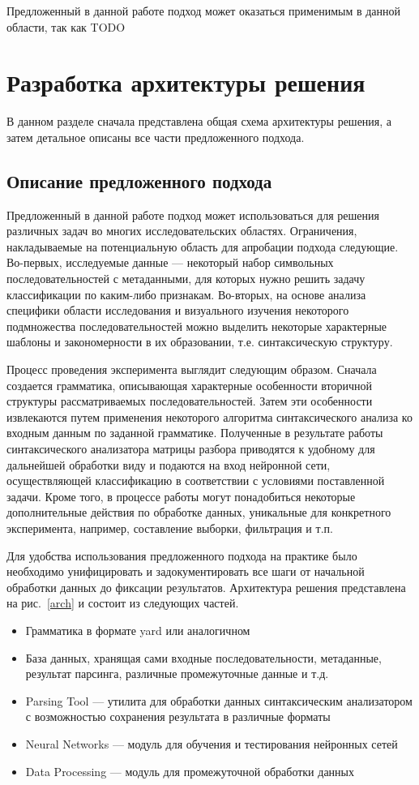 \documentclass[14pt]{matmex-diploma-custom}
\begin{document}
Предложенный в данной работе подход может оказаться применимым в данной области, так как 
TODO

\section{Разработка архитектуры решения}
В данном разделе сначала представлена общая схема архитектуры решения, а затем детальное описаны все части предложенного подхода. 
\subsection{Описание предложенного подхода}
Предложенный в данной работе подход может использоваться для решения различных задач во многих исследовательских областях. Ограничения, накладываемые на потенциальную область для апробации подхода следующие. Во-первых, исследуемые данные --- некоторый набор символьных последовательностей с метаданными, для которых нужно решить задачу классификации по каким-либо признакам. Во-вторых, на основе анализа специфики области исследования и визуального изучения некоторого подмножества последовательностей можно выделить некоторые характерные шаблоны и закономерности в их образовании, т.е. синтаксическую структуру. 

Процесс проведения эксперимента выглядит следующим образом. Сначала создается грамматика, описывающая характерные особенности вторичной структуры рассматриваемых последовательностей. Затем эти особенности извлекаются путем применения некоторого алгоритма синтаксического анализа ко входным данным по заданной грамматике. Полученные в результате работы синтаксического анализатора матрицы разбора приводятся к удобному для дальнейшей обработки виду и подаются на вход нейронной сети, осуществляющей классификацию в соответствии с условиями поставленной задачи. Кроме того, в процессе работы могут понадобиться некоторые дополнительные действия по обработке данных, уникальные для конкретного эксперимента, например, составление выборки, фильтрация и т.п.

Для удобства использования предложенного подхода на практике было необходимо унифицировать и задокументировать все шаги от начальной обработки данных до фиксации результатов. Архитектура решения представлена на рис.~\ref{arch} и состоит из следующих частей.
\begin{itemize}
    \item Грамматика в формате yard или аналогичном
    \item База данных, хранящая сами входные последовательности, метаданные, результат парсинга, различные промежуточные данные и т.д.
    \item Parsing Tool --- утилита для обработки данных синтаксическим анализатором с возможностью сохранения результата в различные форматы
    \item Neural Networks --- модуль для обучения и тестирования нейронных сетей
    \item Data Processing --- модуль для промежуточной обработки данных
\end{itemize}
\end{document}

